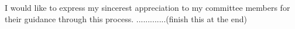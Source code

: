 \begin{acknowledgements}


I would like to express my sincerest appreciation to my committee members for their guidance through this process.  .............(finish this at the end)

\vspace*{20mm}

\end{acknowledgements}
